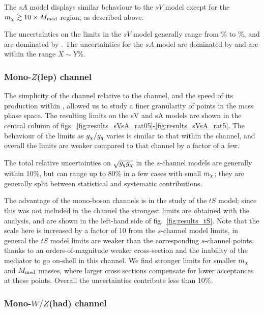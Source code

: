 The $sA$ model displays similar behaviour to the $sV$ model except for the $m_{\chi} \gtrsim 10 \times M_{\mathrm{med}}$ region, as described above.

The uncertainties on the limits in the $sV$ model generally range from \% to \%, and are dominated by . The uncertainties for the $sA$ model are dominated by  and are within the range $X \sim Y$\%.

\subsubsection{Mono-$Z$(lep) channel}

The simplicity of the \monoZ channel relative to the \monojet channel, and the speed of its production within \MG, allowed us to study a finer granularity of points in the mass phase space. The resulting limits on the sV and sA models are shown in the central column of figs.~\ref{fig:results_sVsA_rat05}-\ref{fig:results_sVsA_rat5}. The behaviour of the limits as $g_{\chi} / g_q$ varies is similar to that within the \monojet channel, and overall the limits are weaker compared to that channel by a factor of a few.

The total relative uncertainties on $\sqrt{g_q g_{\chi}}$ in the $s$-channel models are generally within 10\%, but can range up to 80\% in a few cases with small $m_{\chi}$; they are generally split between statistical and systematic contributions.

The advantage of the mono-boson channels is in the study of the $tS$ model; since this was not included in the \monojet channel the strongest limits are obtained with the \monoZ analysis, and are shown in the left-hand side of fig.~\ref{fig:results_tS}. Note that the scale here is increased by a factor of 10 from the $s$-channel model limits, in general the $tS$ model limits are weaker than the corresponding $s$-channel points, thanks to an orders-of-magnitude weaker cross-section and the inability of the mediator to go on-shell in this channel. We find stronger limits for smaller $m_{\chi}$ and $M_{\mathrm{med}}$ masses, where larger cross sections compensate for lower acceptances at these points. Overall the uncertainties contribute less than 10\%.

\subsubsection{Mono-$W/Z$(had) channel}

